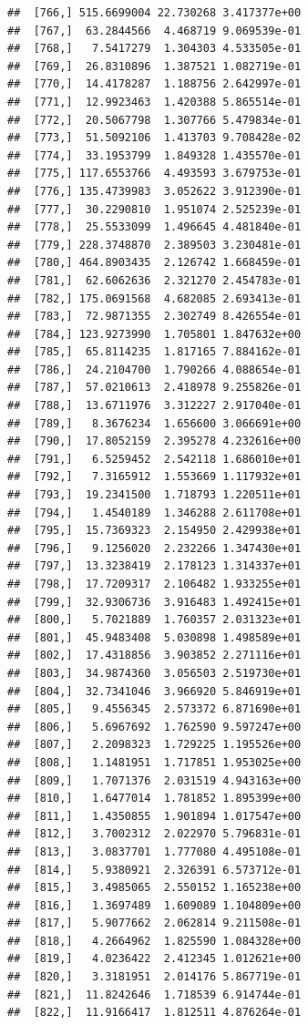 \documentclass[article]{jss}\usepackage[]{graphicx}\usepackage[]{xcolor}
\makeatletter
\newenvironment{kframe}{%
 \def\at@end@of@kframe{}%
 \ifinner\ifhmode%
  \def\at@end@of@kframe{\end{minipage}}%
  \begin{minipage}{\columnwidth}%
 \fi\fi%
 \def\FrameCommand##1{\hskip\@totalleftmargin \hskip-\fboxsep
 \colorbox{shadecolor}{##1}\hskip-\fboxsep
     \hskip-\linewidth \hskip-\@totalleftmargin \hskip\columnwidth}%
 \MakeFramed {\advance\hsize-\width
   \@totalleftmargin\z@ \linewidth\hsize
   \@setminipage}}%
 {\par\unskip\endMakeFramed%
 \at@end@of@kframe}
\newenvironment{knitrout}{}{} %
\makeatother
\begin{document}
\begin{knitrout}
\begin{kframe}
\begin{verbatim}
##  [766,] 515.6699004 22.730268 3.417377e+00
##  [767,]  63.2844566  4.468719 9.069539e-01
##  [768,]   7.5417279  1.304303 4.533505e-01
##  [769,]  26.8310896  1.387521 1.082719e-01
##  [770,]  14.4178287  1.188756 2.642997e-01
##  [771,]  12.9923463  1.420388 5.865514e-01
##  [772,]  20.5067798  1.307766 5.479834e-01
##  [773,]  51.5092106  1.413703 9.708428e-02
##  [774,]  33.1953799  1.849328 1.435570e-01
##  [775,] 117.6553766  4.493593 3.679753e-01
##  [776,] 135.4739983  3.052622 3.912390e-01
##  [777,]  30.2290810  1.951074 2.525239e-01
##  [778,]  25.5533099  1.496645 4.481840e-01
##  [779,] 228.3748870  2.389503 3.230481e-01
##  [780,] 464.8903435  2.126742 1.668459e-01
##  [781,]  62.6062636  2.321270 2.454783e-01
##  [782,] 175.0691568  4.682085 2.693413e-01
##  [783,]  72.9871355  2.302749 8.426554e-01
##  [784,] 123.9273990  1.705801 1.847632e+00
##  [785,]  65.8114235  1.817165 7.884162e-01
##  [786,]  24.2104700  1.790266 4.088654e-01
##  [787,]  57.0210613  2.418978 9.255826e-01
##  [788,]  13.6711976  3.312227 2.917040e-01
##  [789,]   8.3676234  1.656600 3.066691e+00
##  [790,]  17.8052159  2.395278 4.232616e+00
##  [791,]   6.5259452  2.542118 1.686010e+01
##  [792,]   7.3165912  1.553669 1.117932e+01
##  [793,]  19.2341500  1.718793 1.220511e+01
##  [794,]   1.4540189  1.346288 2.611708e+01
##  [795,]  15.7369323  2.154950 2.429938e+01
##  [796,]   9.1256020  2.232266 1.347430e+01
##  [797,]  13.3238419  2.178123 1.314337e+01
##  [798,]  17.7209317  2.106482 1.933255e+01
##  [799,]  32.9306736  3.916483 1.492415e+01
##  [800,]   5.7021889  1.760357 2.031323e+01
##  [801,]  45.9483408  5.030898 1.498589e+01
##  [802,]  17.4318856  3.903852 2.271116e+01
##  [803,]  34.9874360  3.056503 2.519730e+01
##  [804,]  32.7341046  3.966920 5.846919e+01
##  [805,]   9.4556345  2.573372 6.871690e+01
##  [806,]   5.6967692  1.762590 9.597247e+00
##  [807,]   2.2098323  1.729225 1.195526e+00
##  [808,]   1.1481951  1.717851 1.953025e+00
##  [809,]   1.7071376  2.031519 4.943163e+00
##  [810,]   1.6477014  1.781852 1.895399e+00
##  [811,]   1.4350855  1.901894 1.017547e+00
##  [812,]   3.7002312  2.022970 5.796831e-01
##  [813,]   3.0837701  1.777080 4.495108e-01
##  [814,]   5.9380921  2.326391 6.573712e-01
##  [815,]   3.4985065  2.550152 1.165238e+00
##  [816,]   1.3697489  1.609089 1.104809e+00
##  [817,]   5.9077662  2.062814 9.211508e-01
##  [818,]   4.2664962  1.825590 1.084328e+00
##  [819,]   4.0236422  2.412345 1.012621e+00
##  [820,]   3.3181951  2.014176 5.867719e-01
##  [821,]  11.8242646  1.718539 6.914744e-01
##  [822,]  11.9166417  1.812511 4.876264e-01

\end{verbatim}
\end{kframe}
\end{knitrout}
\end{document}
